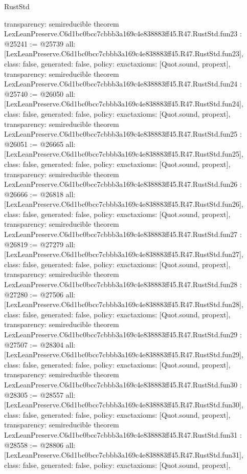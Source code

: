 \begin{lexlean}{RustStd}
\begin{coremodule}
{  transparency: semireducible
}
theorem LexLeanPreserve.C6d1bc0bcc7cbbb3a169c4e838883ff45.R47.RustStd.fun23 : @25241 := @25739 {
  all: [LexLeanPreserve.C6d1bc0bcc7cbbb3a169c4e838883ff45.R47.RustStd.fun23],
  class: false,
  generated: false,
  policy: exact{axioms: [Quot.sound, propext]},
  transparency: semireducible
}
theorem LexLeanPreserve.C6d1bc0bcc7cbbb3a169c4e838883ff45.R47.RustStd.fun24 : @25740 := @26050 {
  all: [LexLeanPreserve.C6d1bc0bcc7cbbb3a169c4e838883ff45.R47.RustStd.fun24],
  class: false,
  generated: false,
  policy: exact{axioms: [Quot.sound, propext]},
  transparency: semireducible
}
theorem LexLeanPreserve.C6d1bc0bcc7cbbb3a169c4e838883ff45.R47.RustStd.fun25 : @26051 := @26665 {
  all: [LexLeanPreserve.C6d1bc0bcc7cbbb3a169c4e838883ff45.R47.RustStd.fun25],
  class: false,
  generated: false,
  policy: exact{axioms: [Quot.sound, propext]},
  transparency: semireducible
}
theorem LexLeanPreserve.C6d1bc0bcc7cbbb3a169c4e838883ff45.R47.RustStd.fun26 : @26666 := @26818 {
  all: [LexLeanPreserve.C6d1bc0bcc7cbbb3a169c4e838883ff45.R47.RustStd.fun26],
  class: false,
  generated: false,
  policy: exact{axioms: [Quot.sound, propext]},
  transparency: semireducible
}
theorem LexLeanPreserve.C6d1bc0bcc7cbbb3a169c4e838883ff45.R47.RustStd.fun27 : @26819 := @27279 {
  all: [LexLeanPreserve.C6d1bc0bcc7cbbb3a169c4e838883ff45.R47.RustStd.fun27],
  class: false,
  generated: false,
  policy: exact{axioms: [Quot.sound, propext]},
  transparency: semireducible
}
theorem LexLeanPreserve.C6d1bc0bcc7cbbb3a169c4e838883ff45.R47.RustStd.fun28 : @27280 := @27506 {
  all: [LexLeanPreserve.C6d1bc0bcc7cbbb3a169c4e838883ff45.R47.RustStd.fun28],
  class: false,
  generated: false,
  policy: exact{axioms: [Quot.sound, propext]},
  transparency: semireducible
}
theorem LexLeanPreserve.C6d1bc0bcc7cbbb3a169c4e838883ff45.R47.RustStd.fun29 : @27507 := @28304 {
  all: [LexLeanPreserve.C6d1bc0bcc7cbbb3a169c4e838883ff45.R47.RustStd.fun29],
  class: false,
  generated: false,
  policy: exact{axioms: [Quot.sound, propext]},
  transparency: semireducible
}
theorem LexLeanPreserve.C6d1bc0bcc7cbbb3a169c4e838883ff45.R47.RustStd.fun30 : @28305 := @28557 {
  all: [LexLeanPreserve.C6d1bc0bcc7cbbb3a169c4e838883ff45.R47.RustStd.fun30],
  class: false,
  generated: false,
  policy: exact{axioms: [Quot.sound, propext]},
  transparency: semireducible
}
theorem LexLeanPreserve.C6d1bc0bcc7cbbb3a169c4e838883ff45.R47.RustStd.fun31 : @28558 := @28806 {
  all: [LexLeanPreserve.C6d1bc0bcc7cbbb3a169c4e838883ff45.R47.RustStd.fun31],
  class: false,
  generated: false,
  policy: exact{axioms: [Quot.sound, propext]},
}
\end{coremodule}
\end{lexlean}
